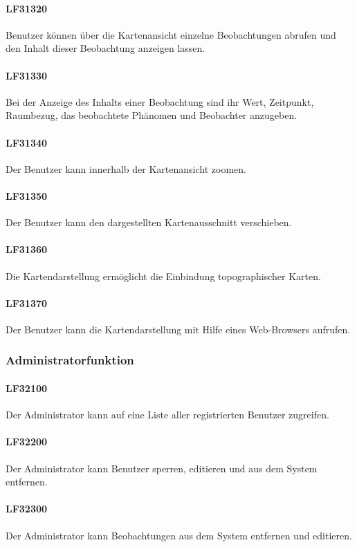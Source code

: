 \documentclass[a4paper,11pt]{article}             %
\begin{document}
			\paragraph{LF31320}
				Benutzer können über die Kartenansicht einzelne Beobachtungen abrufen und den Inhalt dieser Beobachtung anzeigen lassen.
			\paragraph{LF31330}
				Bei der Anzeige des Inhalts einer Beobachtung sind ihr Wert, Zeitpunkt, Raumbezug, das beobachtete Phänomen und Beobachter anzugeben.
			\paragraph{LF31340}
				Der Benutzer kann innerhalb der Kartenansicht zoomen.
			\paragraph{LF31350}
				Der Benutzer kann den dargestellten Kartenausschnitt verschieben.
			\paragraph{LF31360}
				Die Kartendarstellung ermöglicht die Einbindung topographischer Karten.
			\paragraph{LF31370}
				Der Benutzer kann die Kartendarstellung mit Hilfe eines Web-Browsers aufrufen.
		\subsubsection{Administratorfunktion}
			\paragraph{LF32100}
				Der Administrator kann auf eine Liste aller registrierten Benutzer zugreifen.
			\paragraph{LF32200}
				Der Administrator kann Benutzer sperren, editieren und aus dem System entfernen.
			\paragraph{LF32300}
				Der Administrator kann Beobachtungen aus dem System entfernen und editieren.
\end{document}
